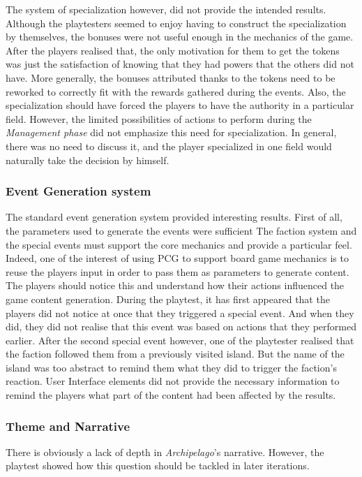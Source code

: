 The system of specialization however, did not provide the intended results. Although the playtesters seemed to enjoy having to construct the specialization by themselves, the bonuses were not useful enough in the mechanics of the game. After the players realised that, the only motivation for them to get the tokens was just the satisfaction of knowing that they had powers that the others did not have. More generally, the bonuses attributed thanks to the tokens need to be reworked to correctly fit with the rewards gathered during the events. Also, the specialization should have forced the players to have the authority in a particular field. However, the limited possibilities of actions to perform during the \textit{Management phase} did not emphasize this need for specialization. In general, there was no need to discuss it, and the player specialized in one field would naturally take the decision by himself.

\subsubsection{Event Generation system}
The standard event generation system provided interesting results. First of all, the parameters used to generate the events were sufficient
The faction system and the special events must support the core mechanics and provide a particular feel. Indeed, one of the interest of using PCG to support board game mechanics is to reuse the players input in order to pass them as parameters to generate content. The players should notice this and understand how their actions influenced the game content generation. During the playtest, it has first appeared that the players did not notice at once that they triggered a special event. And when they did, they did not realise that this event was based on actions that they performed earlier. After the second special event however, one of the playtester realised that the faction followed them from a previously visited island. But the name of the island was too abstract to remind them what they did to trigger the faction's reaction. User Interface elements did not provide the necessary information to remind the players what part of the content had been affected by the results. 

\subsubsection{Theme and Narrative}
There is obviously a lack of depth in \textit{Archipelago}'s narrative. However, the playtest showed how this question should be tackled in later iterations.
